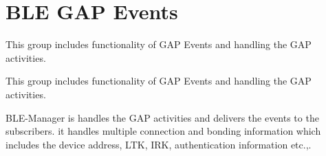 \hypertarget{group__ble__manager__gap__event}{}\section{B\+LE G\+AP Events}
\label{group__ble__manager__gap__event}


This group includes functionality of G\+AP Events and handling the G\+AP activities.  


This group includes functionality of G\+AP Events and handling the G\+AP activities. 

B\+L\+E-\/\+Manager is handles the G\+AP activities and delivers the events to the subscribers. it handles multiple connection and bonding information which includes the device address, L\+TK, I\+RK, authentication information etc.,.